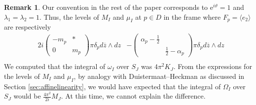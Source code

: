 \documentclass[12pt,letterpaper,reqno]{amsart}
\theoremstyle{remark}
\theoremstyle{definition}
\newtheorem{rem}[thm]{Remark}
\numberwithin{thm}{section}
\numberwithin{equation}{section}
\numberwithin{figure}{section}
\newcommand{\zbar}{{\ensuremath{\overline{z}}}}
\newcommand{\e}{{\mathrm e}}
\begin{document}
\begin{rem} Our convention in the rest of the paper corresponds to $\e^{i \vartheta}=1$ and $\lambda_1=\lambda_2=1$.
Thus, the levels of $M_I$ and $\mu_I$ at $p \in D$ in the frame where $F_p = \langle e_2 \rangle$ are respectively
\begin{align*}
 &2 i  \begin{pmatrix} -m_p& * \\ 0 & m_p \end{pmatrix} \pi \delta_p d \zbar \wedge d z
 & -\begin{pmatrix} \alpha_p - \frac{1}{2} & \\ & \frac{1}{2}- \alpha_p \end{pmatrix} \pi \delta_p d \zbar \wedge d z \\
\end{align*}
We computed that the integral of $\omega_I$ over $S_J$ was $4 \pi^2 K_J$. From the expressions for the levels of $M_I$ and $\mu_I$, by analogy with Duistermaat--Heckman as discussed in Section \ref{sec:affinelinearity}, we would have expected that the integral of $\Omega_I$ over $S_J$ would be $\frac{4 \pi^2}{2i}M_J$. At this time, we cannot explain the difference.
\end{rem}
\end{document}
